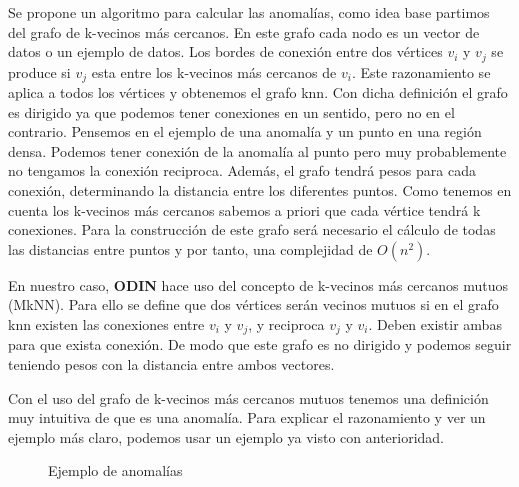 Se propone un algoritmo para calcular las anomalías, como idea base partimos del  
grafo de k-vecinos más cercanos. En este grafo cada nodo es un vector de datos o  
un ejemplo de datos. Los bordes de conexión entre dos vértices $v_i$ y $v_j$ se produce 
si $v_j$ esta entre los k-vecinos más cercanos de $v_i$. Este razonamiento se aplica a todos 
los vértices y obtenemos el grafo knn. Con dicha definición el grafo es dirigido ya que 
podemos tener conexiones en un sentido, pero no en el contrario. Pensemos en el ejemplo de una 
anomalía y un punto en una región densa. Podemos tener conexión de la anomalía al punto pero  
muy probablemente no tengamos la conexión reciproca. Además, el grafo tendrá pesos para 
cada conexión, determinando la distancia entre los diferentes puntos. Como tenemos en cuenta 
los k-vecinos más cercanos sabemos a priori que cada vértice tendrá k conexiones. Para la construcción 
de este grafo será necesario el cálculo de todas las distancias entre puntos y por tanto, 
una complejidad de $O(n^2)$.

En nuestro caso, \textbf{ODIN} hace uso del concepto de k-vecinos más cercanos mutuos (MkNN).
Para ello se define que dos vértices serán vecinos mutuos si en el grafo knn existen  
las conexiones entre $v_i$ y $v_j$, y reciproca $v_j$ y $v_i$. Deben existir ambas para que 
exista conexión. De modo que este grafo es no dirigido y podemos seguir teniendo pesos con la 
distancia entre ambos vectores.

Con el uso del grafo de k-vecinos más cercanos mutuos tenemos una definición muy intuitiva de que
es una anomalía. Para explicar el razonamiento y ver un ejemplo más claro, podemos usar
un ejemplo ya visto con anterioridad.


\begin{figure}[h]
    \caption{\label{fig:explica-knn} Ejemplo de anomalías}
\end{figure}


